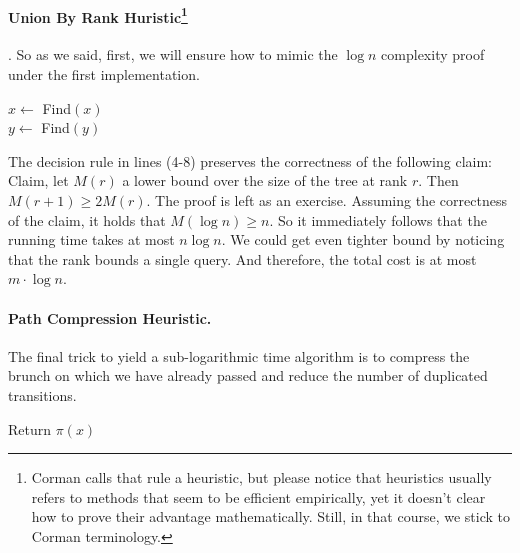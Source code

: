 \paragraph{Union By Rank Huristic\protect\footnote{Corman calls that rule a heuristic, but please notice that heuristics usually refers to methods that seem to be efficient empirically, yet it doesn't clear how to prove their advantage mathematically. Still, in that course, we stick to Corman terminology.}}. So as we said, first, we will ensure how to mimic the $\log n$ complexity proof under the first implementation. 


  \begin{algorithm}[H]
    $x\leftarrow $ Find$\left( x \right)$ \\
    $y\leftarrow $ Find$\left( y \right)$ \\
  \end{algorithm}

The decision rule in lines (4-8) preserves the correctness of the following claim:
Claim, let $M(r)$ a lower bound over the size of the tree at rank $r$. Then $M\left( r+1 \right) \ge 2M\left( r \right)$. The proof is left as an exercise. Assuming the correctness of the claim, it holds that $M\left( \log n \right) \ge n $. So it immediately follows that the running time takes at most $n\log n$. We could get even tighter bound by noticing that the rank bounds a single query. And therefore, the total cost is at most $m \cdot \log n$. 

\paragraph{Path Compression Heuristic.} The final trick to yield a sub-logarithmic time algorithm is to compress the brunch on which we have already passed and reduce the number of duplicated transitions.     

  \begin{algorithm}[H]
    Return $\pi\left(x\right)$ 
  \end{algorithm}    

